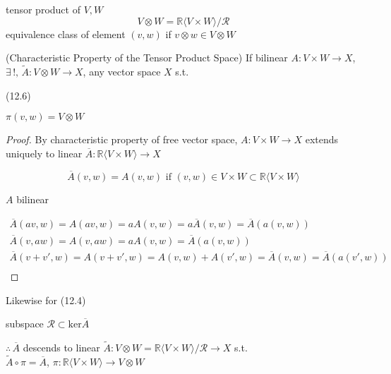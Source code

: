 tensor product of $V, W$ 
\[
V\otimes W = \mathbb{R} \langle V \times W \rangle / \mathcal{R}
\]
equivalence class of element $(v,w)$ if $v\otimes w \in V\otimes W$

\begin{proposition}[12.7] (Characteristic Property of the Tensor Product Space)
  If bilinear $A: V \times W \to X$, $\exists \, !, \, \widetilde{A} : V\otimes W \to X$, any vector space $X$  s.t.
  (12.6)

$\pi(v,w) = V\otimes W$
\end{proposition}

\begin{proof}
By characteristic property of free vector space, $A: V\times W \to X$ extends uniquely to linear $\overline{A} : \mathbb{R} \langle V \times W \rangle \to X$

\[
\overline{A}(v,w) = A(v,w) \text{ if } (v,w) \in V\times W \subset \mathbb{R}\langle V \times W \rangle
\]

$A$ bilinear

\[
\begin{aligned}
  \overline{A}(av,w) = A(av,w) = aA(v,w) = a\overline{A}(v,w) = \overline{A}(a(v,w)) \\ 
  \overline{A}(v,aw) = A(v,aw) = aA(v,w)  = \overline{A}(a(v,w)) \\ 
  \overline{A}(v+v',w)  = A(v+v',w) = A(v,w) +  A(v',w) = \overline{A}(v,w) = \overline{A}(a(v',w)) \\ 
\end{aligned}
\]
\end{proof}

Likewise for (12.4) 

subspace $\mathcal{R} \subset \text{ker}{\overline{A}}$

$\therefore \, \overline{A}$ descends to linear $\widetilde{A} : V\otimes W = \mathbb{R} \langle V\times W \rangle / \mathcal{R} \to X$ s.t. \\
$\widetilde{A} \circ \pi = \overline{A}$, $\pi: \mathbb{R}\langle V \times W \rangle \to V\otimes W$

